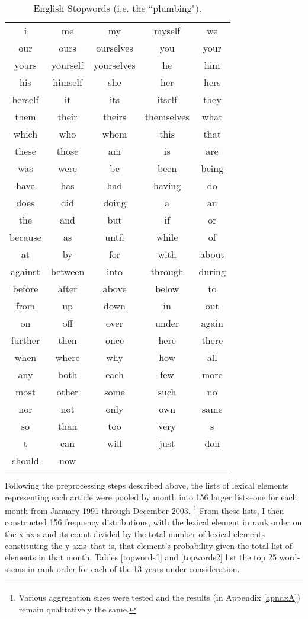 \begin{table}
\begin{center}
\caption[English Stopwords]{English Stopwords (i.e. the ``plumbing"). \label{stop}}
\vspace{0.3in}
\begin{tabular}{ccccc}
\hline 
\hline
i & me & my & myself & we \\
our & ours & ourselves & you & your \\
yours & yourself & yourselves & he & him \\
his & himself & she & her & hers\\
herself & it & its & itself & they\\
them & their & theirs & themselves & what \\
which & who & whom & this & that \\
these & those & am & is & are\\
was & were & be & been & being \\
have & has & had & having & do\\
does & did & doing & a & an \\
the & and & but & if & or \\
because & as & until & while & of \\
at & by & for & with & about \\
against & between & into & through & during \\
before & after & above & below & to \\
from & up & down & in & out \\
on & off & over & under & again \\
further & then & once & here & there \\
when & where & why & how & all \\
any & both & each & few & more \\
most & other & some & such & no \\
nor & not & only & own & same \\
so & than & too & very & s \\
t & can & will & just & don \\
should & now & & & \\
\hline
\end{tabular}
\end{center}
\end{table}

Following the preprocessing steps described above, the lists of lexical elements representing each article were pooled by month into 156 larger lists--one for each month from January 1991 through December 2003. \footnote{Various aggregation sizes were tested and the results (in Appendix \ref{apndxA}) remain qualitatively the same.} From these lists, I then constructed 156 frequency distributions, with the lexical element in rank order on the x-axis and its count divided by the total number of lexical elements constituting the y-axis--that is, that element's probability given the total list of elements in that month. Tables \ref{topwords1} and \ref{topwords2} list the top 25 word-stems in rank order for each of the 13 years under consideration. 

